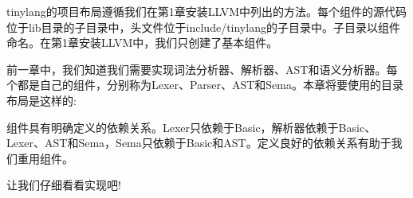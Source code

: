 tinylang的项目布局遵循我们在第1章安装LLVM中列出的方法。每个组件的源代码位于lib目录的子目录中，头文件位于include/tinylang的子目录中。子目录以组件命名。在第1章安装LLVM中，我们只创建了基本组件。

前一章中，我们知道我们需要实现词法分析器、解析器、AST和语义分析器。每个都是自己的组件，分别称为Lexer、Parser、AST和Sema。本章将要使用的目录布局是这样的:


组件具有明确定义的依赖关系。Lexer只依赖于Basic，解析器依赖于Basic、Lexer、AST和Sema，Sema只依赖于Basic和AST。定义良好的依赖关系有助于我们重用组件。

让我们仔细看看实现吧!